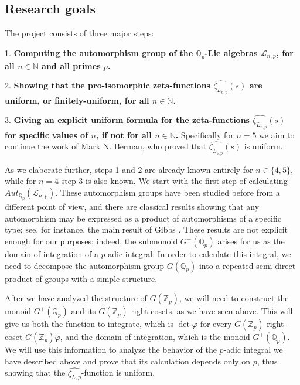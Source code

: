 \documentclass[12pt]{article}
\begin{document}
\subsection{Research goals}
The project consists of three major steps:\par
1. \textbf{Computing the automorphism group of the $\mathbb{Q}_p$-Lie algebras $\mathcal{L}_{n,p}$, for all $n\in\mathbb{N}$ and all primes $p$.}\par
2. \textbf{Showing that the pro-isomorphic zeta-functions $\hat{\zeta_{L_{n,p}}}(s)$ are uniform, or finitely-uniform, for all $n\in\mathbb{N}$.}\par
3. \textbf{Giving an explicit uniform formula for the zeta-functions $\hat{\zeta_{L_{n,p}}}(s)$ for specific values of $n$, if not for all $n\in\mathbb{N}$.}
Specifically for $n=5$ we aim to continue the work of Mark N. Berman, who proved that $\hat{\zeta_{L_{5,p}}}(s)$ is uniform.\par
As we elaborate further, steps 1 and 2 are already known entirely for $n\in\{4,5\}$, while for $n=4$ step 3 is also known.
We start with the first step of calculating $Aut_{\mathbb{Q}_p}(\mathcal{L}_{n,p})$. These automorphism groups have been studied before from a different point of view, and there are classical results showing that any automorphism may be expressed as a product of automorphisms of a specific type; see, for instance, the main result of Gibbs \cite{Gibbs}.  These results are not explicit enough for our purposes; indeed, the submonoid $G^+(\mathbb{Q}_p)$ arises for us as the domain of integration of a $p$-adic integral.  In order to calculate this integral, we need to decompose the automorphism group $G(\mathbb{Q}_p)$ into a repeated semi-direct product of groups with a simple structure.
\par
After we have analyzed the structure of $G(\mathbb{Z}_p)$, we will need to construct the monoid $G^+(\mathbb{Q}_p)$ and its $G(\mathbb{Z}_p)$ right-cosets, as we have seen above. This will give us both the function to integrate, which is $\det\varphi$ for every $G(\mathbb{Z}_p)$ right-coset $G(\mathbb{Z}_p)\varphi$, and the domain of integration, which is the monoid $G^+(\mathbb{Q}_p)$. We will use this information to analyze the behavior of the $p$-adic integral we have described above and prove that its calculation depends only on $p$, thus showing that the $\hat{\zeta_{L,p}}$-function is uniform.
\end{document}
